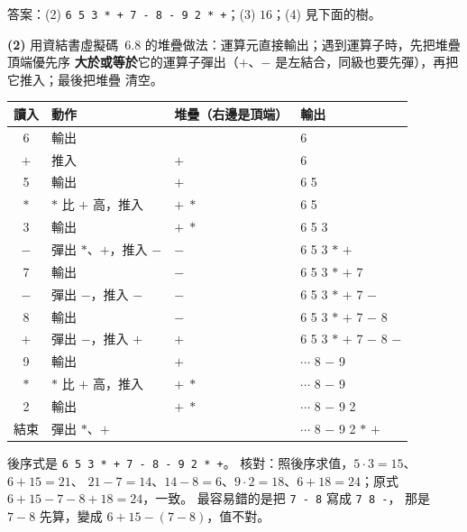 \begin{pastsoln}
答案：(2) \texttt{6 5 3 * + 7 - 8 - 9 2 * +}；(3) $16$；(4) 見下面的樹。

\textbf{(2)} 用資結書虛擬碼~6.8 的堆疊做法：運算元直接輸出；遇到運算子時，先把堆疊頂端優先序
\textbf{大於或等於}它的運算子彈出（$+$、$-$ 是左結合，同級也要先彈），再把它推入；最後把堆疊
清空。
\begin{center}
\small
\begin{tabular}{clll}
\toprule
讀入 & 動作 & 堆疊（右邊是頂端） & 輸出 \\
\midrule
6 & 輸出 & & 6 \\
$+$ & 推入 & $+$ & 6 \\
5 & 輸出 & $+$ & 6 5 \\
$*$ & $*$ 比 $+$ 高，推入 & $+\;*$ & 6 5 \\
3 & 輸出 & $+\;*$ & 6 5 3 \\
$-$ & 彈出 $*$、$+$，推入 $-$ & $-$ & 6 5 3 $*$ $+$ \\
7 & 輸出 & $-$ & 6 5 3 $*$ $+$ 7 \\
$-$ & 彈出 $-$，推入 $-$ & $-$ & 6 5 3 $*$ $+$ 7 $-$ \\
8 & 輸出 & $-$ & 6 5 3 $*$ $+$ 7 $-$ 8 \\
$+$ & 彈出 $-$，推入 $+$ & $+$ & 6 5 3 $*$ $+$ 7 $-$ 8 $-$ \\
9 & 輸出 & $+$ & $\cdots$ 8 $-$ 9 \\
$*$ & $*$ 比 $+$ 高，推入 & $+\;*$ & $\cdots$ 8 $-$ 9 \\
2 & 輸出 & $+\;*$ & $\cdots$ 8 $-$ 9 2 \\
結束 & 彈出 $*$、$+$ & & $\cdots$ 8 $-$ 9 2 $*$ $+$ \\
\bottomrule
\end{tabular}
\end{center}
後序式是 \texttt{6 5 3 * + 7 - 8 - 9 2 * +}。 核對：照後序求值，$5 \cdot 3 = 15$、$6 + 15 = 21$、
$21 - 7 = 14$、$14 - 8 = 6$、$9 \cdot 2 = 18$、$6 + 18 = 24$；原式
$6 + 15 - 7 - 8 + 18 = 24$，一致。 最容易錯的是把 \texttt{7 - 8} 寫成 \texttt{7 8 -}，
那是 $7 - 8$ 先算，變成 $6 + 15 - (7 - 8)$，值不對。


\end{pastsoln}
